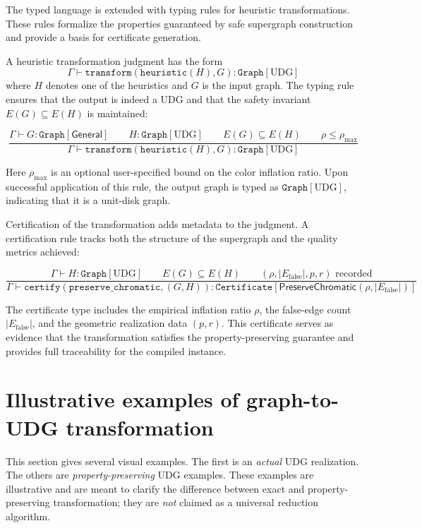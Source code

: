 \documentclass[11pt]{article}
\newcommand{\UDG}{\mathrm{UDG}}
\newcommand{\Gen}{\mathsf{General}}
\newcommand{\Efalse}{E_{\mathrm{false}}}
\begin{document}
The typed language is extended with typing rules for heuristic transformations. These rules formalize the properties guaranteed by safe supergraph construction and provide a basis for certificate generation.

A heuristic transformation judgment has the form
\[
\Gamma \vdash \texttt{transform}(\texttt{heuristic}(H), G) : \texttt{Graph}[\UDG]
\]
where $H$ denotes one of the heuristics and $G$ is the input graph. The typing rule ensures that the output is indeed a UDG and that the safety invariant $E(G) \subseteq E(H)$ is maintained:

\[
\frac{
  \Gamma \vdash G : \texttt{Graph}[\Gen]
  \qquad
  H : \texttt{Graph}[\UDG]
  \qquad
  E(G)\subseteq E(H)
  \qquad
  \rho \le \rho_{\max}
}{
  \Gamma \vdash \texttt{transform}(\texttt{heuristic}(H), G) : \texttt{Graph}[\UDG]
}
\]

Here $\rho_{\max}$ is an optional user-specified bound on the color inflation ratio. Upon successful application of this rule, the output graph is typed as $\texttt{Graph}[\UDG]$, indicating that it is a unit-disk graph.

Certification of the transformation adds metadata to the judgment. A certification rule tracks both the structure of the supergraph and the quality metrics achieved:

\[
\frac{
  \Gamma \vdash H : \texttt{Graph}[\UDG]
  \qquad
  E(G)\subseteq E(H)
  \qquad
  (\rho, |\Efalse|, p, r) \text{ recorded}
}{
  \Gamma \vdash \texttt{certify}(\texttt{preserve\_chromatic}, (G,H)) : \texttt{Certificate}[\mathsf{PreserveChromatic}(\rho,|\Efalse|)]
}
\]

The certificate type includes the empirical inflation ratio $\rho$, the false-edge count $|\Efalse|$, and the geometric realization data $(p,r)$. This certificate serves as evidence that the transformation satisfies the property-preserving guarantee and provides full traceability for the compiled instance.

\newpage

\section{Illustrative examples of graph-to-UDG transformation}

This section gives several visual examples. The first is an \emph{actual} UDG realization. The others are \emph{property-preserving} UDG examples. These examples are illustrative and are meant to clarify the difference between exact and property-preserving transformation; they are \emph{not} claimed as a universal reduction algorithm.
\end{document}
